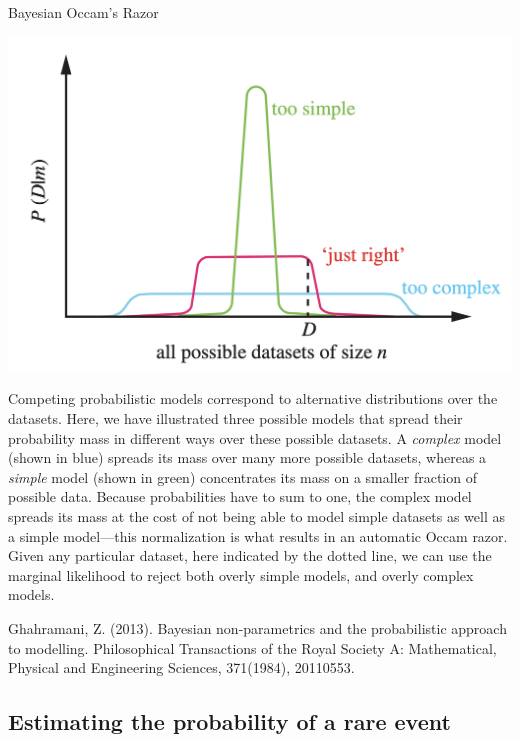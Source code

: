 \documentclass[10pt]{beamer}
\begin{document}
\begin{frame}{Bayesian Occam's Razor}
\scriptsize

\begin{center}
\includegraphics[width=.6\textwidth]{images/auto_occams_razor}
\end{center}
Competing probabilistic models
correspond to alternative distributions over the datasets. Here, we have illustrated three possible models that spread their
probability mass in different ways over these possible datasets. A \textit{complex} model (shown in blue) spreads its mass over many
more possible datasets, whereas a \textit{simple} model (shown in green) concentrates its mass on a smaller fraction of possible data.
Because probabilities have to sum to one, the complex model spreads its mass at the cost of not being able to model simple
datasets as well as a simple model—this normalization is what results in an automatic Occam razor. Given any particular
dataset, here indicated by the dotted line, we can use the marginal likelihood to reject both overly simple models, and overly
complex models. 


\hfill \tiny Ghahramani, Z. (2013). Bayesian non-parametrics and the probabilistic approach to modelling. Philosophical Transactions of the Royal Society A: Mathematical, Physical and Engineering Sciences, 371(1984), 20110553.
\end{frame}


\subsection{Estimating the probability of a rare event}
\end{document}
